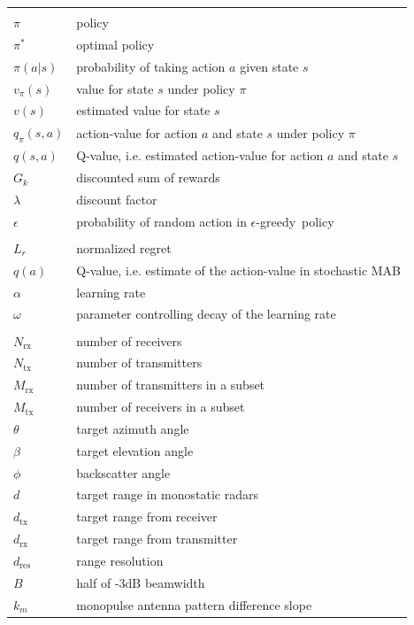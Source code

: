 \documentclass[english, 12pt, a4paper, elec, utf8, a-1b, online]{aaltothesis}
\numberwithin{equation}{section}
\newcommand{\egreedy}{$\epsilon$-greedy~}
\newcommand{\regret}{L_r}
\begin{document}
\begin{longtable}{ll}
&\\
$\pi$ & policy \\
$\pi^*$ & optimal policy \\
$\pi(a|s)$ & probability of taking action $a$ given state $s$ \\
$v_\pi(s)$ & value for state $s$ under policy $\pi$ \\
$v(s)$ & estimated value for state $s$ \\
$q_\pi(s, a)$ & action-value for action $a$ and state $s$ under policy $\pi$ \\
$q(s, a)$ &  Q-value, i.e. estimated action-value for action $a$ and state $s$ \\
$G_k$ & discounted sum of rewards \\
$\lambda$ & discount factor \\
$\epsilon$ & probability of random action in \egreedy policy \\
&\\
$\regret$ & normalized regret \\
$q(a)$ & Q-value, i.e. estimate of the action-value in stochastic MAB \\
$\alpha$ & learning rate \\
$\omega$ & parameter controlling decay of the learning rate \\ 
&\\
$N_\text{rx}$ & number of receivers \\
$N_\text{tx}$ & number of transmitters \\
$M_\text{rx}$ & number of transmitters in a subset \\
$M_\text{tx}$ & number of receivers in a subset \\
$\theta$ & target azimuth angle \\
$\beta$ & target elevation angle \\
$\phi$ & backscatter angle \\
$d$ & target range in monostatic radars \\
$d_\text{tx}$ & target range from receiver \\
$d_\text{rx}$ & target range from transmitter \\
$d_\text{res}$ & range resolution \\
$B$ & half of -3dB beamwidth \\
$k_m$ & monopulse antenna pattern difference slope \\

\end{longtable}
\end{document}
